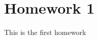 \documentclass[11pt]{article}
\begin{document}
\section*{Homework 1}
This is the first homework
\end{document}
